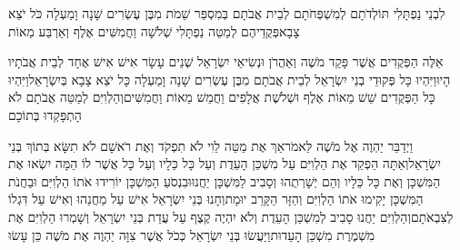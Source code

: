 \documentclass[../main/main.tex]{subfiles}
\begin{document}
\begin{multicols}{\ncols}
לִבְנֵי\SubEnd{} נַפְתָּלִי תּוֹלְדֹתָם לְמִשְׁפְּחֹתָם לְבֵית אֲבֹתָם בְּמִסְפַּר שֵׁמֹת מִבֶּן עֶשְׂרִים שָׁנָה וָמַעְלָה כֹּל יֹצֵא צָבָא\PreVerseSpace{}פְּקֻדֵיהֶם לְמַטֵּה נַפְתָּלִי שְׁלֹשָׁה וַחֲמִשִּׁים אֶלֶף וְאַרְבַּע מֵאוֹת\OpenSection{}\par
{}אֵלֶּה הַפְּקֻדִים אֲשֶׁר פָּקַד מֹשֶׁה וְאַהֲרֹן וּנְשִׂיאֵי יִשְׂרָאֵל שְׁנֵים עָשָׂר אִישׁ אִישׁ אֶחָד לְבֵית אֲבֹתָיו הָיוּ\PreVerseSpace{}וַיִּהְיוּ כָּל פְּקוּדֵי בְנֵי יִשְׂרָאֵל לְבֵית אֲבֹתָם מִבֶּן עֶשְׂרִים שָׁנָה וָמַעְלָה כָּל יֹצֵא צָבָא בְּיִשְׂרָאֵל\PreVerseSpace{}וַיִּהְיוּ כָּל הַפְּקֻדִים שֵׁשׁ מֵאוֹת אֶלֶף וּשְׁלֹשֶׁת אֲלָפִים וַחֲמֵשׁ מֵאוֹת וַחֲמִשִּׁים\PreVerseSpace{}וְהַלְוִיִּם לְמַטֵּה אֲבֹתָם לֹא הָתְפָּקְדוּ בְּתוֹכָם\OpenSection{}\par
{}וַיְדַבֵּר יַהְוֶה אֶל מֹשֶׁה לֵּאמֹר\PreVerseSpace{}אַךְ אֶת מַטֵּה לֵוִי לֹא תִפְקֹד וְאֶת רֹאשָׁם לֹא תִשָּׂא בְּתוֹךְ בְּנֵי יִשְׂרָאֵל\PreVerseSpace{}וְאַתָּה הַפְקֵד אֶת הַלְוִיִּם עַל מִשְׁכַּן הָעֵדֻת וְעַל כָּל כֵּלָיו וְעַל כָּל אֲשֶׁר לוֹ הֵמָּה יִשְׂאוּ אֶת הַמִּשְׁכָּן וְאֶת כָּל כֵּלָיו וְהֵם יְשָׁרְתֻהוּ וְסָבִיב לַמִּשְׁכָּן יַחֲנוּ\PreVerseSpace{}וּבִנְסֹעַ הַמִּשְׁכָּן יוֹרִידוּ אֹתוֹ הַלְוִיִּם וּבַחֲנֹת הַמִּשְׁכָּן יָקִימוּ אֹתוֹ הַלְוִיִּם וְהַזָּר הַקָּרֵב יוּמָת\PreVerseSpace{}וְחָנוּ בְּנֵי יִשְׂרָאֵל אִישׁ עַל מַחֲנֵהוּ וְאִישׁ עַל דִּגְלוֹ לְצִבְאֹתָם\PreVerseSpace{}וְהַלְוִיִּם יַחֲנוּ סָבִיב לְמִשְׁכַּן הָעֵדֻת וְלֹא יִהְיֶה קֶצֶף עַל עֲדַת בְּנֵי יִשְׂרָאֵל וְשָׁמְרוּ הַלְוִיִּם אֶת מִשְׁמֶרֶת מִשְׁכַּן הָעֵדוּת\PreVerseSpace{}וַיַּעֲשׂוּ בְּנֵי יִשְׂרָאֵל כְּכֹל אֲשֶׁר צִוָּה יַהְוֶה אֶת מֹשֶׁה כֵּן עָשׂוּ\OpenSection{}\par

\end{multicols}
\end{document}
